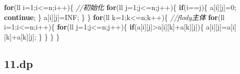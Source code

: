 \documentclass[
]{article}
\newenvironment{Shaded}{}{}
\newcommand{\CommentTok}[1]{\textcolor[rgb]{0.38,0.63,0.69}{\textit{#1}}}
\newcommand{\ControlFlowTok}[1]{\textcolor[rgb]{0.00,0.44,0.13}{\textbf{#1}}}
\newcommand{\DecValTok}[1]{\textcolor[rgb]{0.25,0.63,0.44}{#1}}
\newcommand{\NormalTok}[1]{#1}
\newcommand{\OperatorTok}[1]{\textcolor[rgb]{0.40,0.40,0.40}{#1}}
\begin{document}
\begin{Shaded}
\begin{Highlighting}[]
	\ControlFlowTok{for}\OperatorTok{(}\NormalTok{ll i}\OperatorTok{=}\DecValTok{1}\OperatorTok{;}\NormalTok{i}\OperatorTok{\textless{}=}\NormalTok{n}\OperatorTok{;}\NormalTok{i}\OperatorTok{++)\{} \CommentTok{//初始化}
		\ControlFlowTok{for}\OperatorTok{(}\NormalTok{ll j}\OperatorTok{=}\DecValTok{1}\OperatorTok{;}\NormalTok{j}\OperatorTok{\textless{}=}\NormalTok{n}\OperatorTok{;}\NormalTok{j}\OperatorTok{++)\{}
			\ControlFlowTok{if}\OperatorTok{(}\NormalTok{i}\OperatorTok{==}\NormalTok{j}\OperatorTok{)\{}
\NormalTok{				a}\OperatorTok{[}\NormalTok{i}\OperatorTok{][}\NormalTok{j}\OperatorTok{]=}\DecValTok{0}\OperatorTok{;}
				\ControlFlowTok{continue}\OperatorTok{;}
			\OperatorTok{\}} 
\NormalTok{			a}\OperatorTok{[}\NormalTok{i}\OperatorTok{][}\NormalTok{j}\OperatorTok{]=}\NormalTok{INF}\OperatorTok{;}
		\OperatorTok{\}}
	\OperatorTok{\}} 
	\ControlFlowTok{for}\OperatorTok{(}\NormalTok{ll k}\OperatorTok{=}\DecValTok{1}\OperatorTok{;}\NormalTok{k}\OperatorTok{\textless{}=}\NormalTok{n}\OperatorTok{;}\NormalTok{k}\OperatorTok{++)\{} \CommentTok{//flody主体}
		\ControlFlowTok{for}\OperatorTok{(}\NormalTok{ll i}\OperatorTok{=}\DecValTok{1}\OperatorTok{;}\NormalTok{i}\OperatorTok{\textless{}=}\NormalTok{n}\OperatorTok{;}\NormalTok{i}\OperatorTok{++)\{}
			\ControlFlowTok{for}\OperatorTok{(}\NormalTok{ll j}\OperatorTok{=}\DecValTok{1}\OperatorTok{;}\NormalTok{j}\OperatorTok{\textless{}=}\NormalTok{n}\OperatorTok{;}\NormalTok{j}\OperatorTok{++)\{}
				\ControlFlowTok{if}\OperatorTok{(}\NormalTok{a}\OperatorTok{[}\NormalTok{i}\OperatorTok{][}\NormalTok{j}\OperatorTok{]\textgreater{}}\NormalTok{a}\OperatorTok{[}\NormalTok{i}\OperatorTok{][}\NormalTok{k}\OperatorTok{]+}\NormalTok{a}\OperatorTok{[}\NormalTok{k}\OperatorTok{][}\NormalTok{j}\OperatorTok{])\{}
\NormalTok{					a}\OperatorTok{[}\NormalTok{i}\OperatorTok{][}\NormalTok{j}\OperatorTok{]=}\NormalTok{a}\OperatorTok{[}\NormalTok{i}\OperatorTok{][}\NormalTok{k}\OperatorTok{]+}\NormalTok{a}\OperatorTok{[}\NormalTok{k}\OperatorTok{][}\NormalTok{j}\OperatorTok{];}
				\OperatorTok{\}}
			\OperatorTok{\}}
		\OperatorTok{\}}
	\OperatorTok{\}}
\end{Highlighting}
\end{Shaded}

\hypertarget{11dp}{%
\subsection{11.dp}\label{11dp}}
\end{document}
